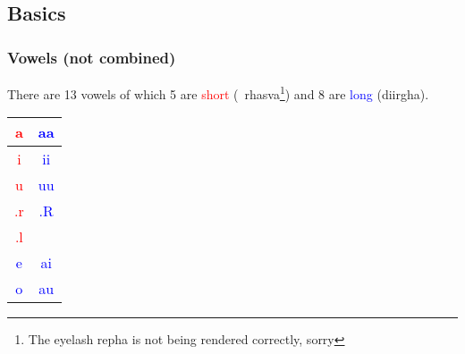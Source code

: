 \documentclass[a4paper, 12pt]{article}
\newcommand \sansletter[1]{
    \fontsize{1in}{1.2in}\selectfont 
    #1
}
\newcommand \eng[1]{
    \textenglish{#1}
}
\newcommand \shortsansletter[1]{
    \textcolor{red}{\sansletter{#1}}
}
\newcommand \longsansletter[1]{
    \textcolor{blue}{\sansletter{#1}}
}
\begin{document}
\subsection{\eng{Basics}}
\subsubsection{\eng{Vowels (not combined)}}
\eng{
    There are 13 vowels of which 5 are \textcolor{red}{short} (\textsanskrit{~rhasva}\footnote{\eng{The eyelash repha is not being rendered correctly, sorry}}) and 8 are \textcolor{blue}{long} (\textsanskrit{diirgha}).
}
\begin{center}
\begin{tabular}{|c|c|}
\hline
    \shortsansletter{a} &
    \longsansletter{aa}\\ 
    \hline
    \shortsansletter{i} &
    \longsansletter{ii} \\
    \hline
    \shortsansletter{u} &
    \longsansletter{uu} \\
    \hline
    \shortsansletter{.r} &
    \longsansletter{.R}\\
    \hline
    \shortsansletter{.l} &
    \sansletter{ }\\
    \hline
    \longsansletter{e} &
    \longsansletter{ai}\\
    \hline
    \longsansletter{o} &
    \longsansletter{au}\\
\hline
\end{tabular}
\end{center}
\end{document}
